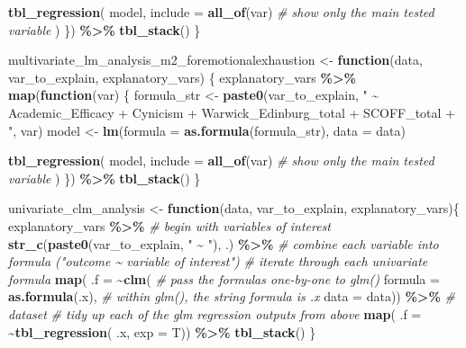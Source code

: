 \documentclass[
]{article}
\newenvironment{Shaded}{\begin{snugshade}}{\end{snugshade}}
\newcommand{\AttributeTok}[1]{\textcolor[rgb]{0.13,0.29,0.53}{#1}}
\newcommand{\CommentTok}[1]{\textcolor[rgb]{0.56,0.35,0.01}{\textit{#1}}}
\newcommand{\ControlFlowTok}[1]{\textcolor[rgb]{0.13,0.29,0.53}{\textbf{#1}}}
\newcommand{\FunctionTok}[1]{\textcolor[rgb]{0.13,0.29,0.53}{\textbf{#1}}}
\newcommand{\NormalTok}[1]{#1}
\newcommand{\OtherTok}[1]{\textcolor[rgb]{0.56,0.35,0.01}{#1}}
\newcommand{\SpecialCharTok}[1]{\textcolor[rgb]{0.81,0.36,0.00}{\textbf{#1}}}
\newcommand{\StringTok}[1]{\textcolor[rgb]{0.31,0.60,0.02}{#1}}
\begin{document}
\begin{Shaded}
\begin{Highlighting}[]
      \FunctionTok{tbl\_regression}\NormalTok{(}
\NormalTok{        model,}
        \AttributeTok{include =} \FunctionTok{all\_of}\NormalTok{(var)  }\CommentTok{\# show only the main tested variable}
\NormalTok{      )}
\NormalTok{    \}) }\SpecialCharTok{\%\textgreater{}\%}
    \FunctionTok{tbl\_stack}\NormalTok{()}
\NormalTok{\}}



\NormalTok{multivariate\_lm\_analysis\_m2\_foremotionalexhaustion }\OtherTok{\textless{}{-}} \ControlFlowTok{function}\NormalTok{(data, var\_to\_explain, explanatory\_vars) \{}
\NormalTok{  explanatory\_vars }\SpecialCharTok{\%\textgreater{}\%}
    \FunctionTok{map}\NormalTok{(}\ControlFlowTok{function}\NormalTok{(var) \{}
\NormalTok{      formula\_str }\OtherTok{\textless{}{-}} \FunctionTok{paste0}\NormalTok{(var\_to\_explain, }\StringTok{" \textasciitilde{} Academic\_Efficacy + Cynicism + Warwick\_Edinburg\_total + SCOFF\_total + "}\NormalTok{, var)}
\NormalTok{      model }\OtherTok{\textless{}{-}} \FunctionTok{lm}\NormalTok{(}\AttributeTok{formula =} \FunctionTok{as.formula}\NormalTok{(formula\_str), }\AttributeTok{data =}\NormalTok{ data)}
      
      \FunctionTok{tbl\_regression}\NormalTok{(}
\NormalTok{        model,}
        \AttributeTok{include =} \FunctionTok{all\_of}\NormalTok{(var)  }\CommentTok{\# show only the main tested variable}
\NormalTok{      )}
\NormalTok{    \}) }\SpecialCharTok{\%\textgreater{}\%}
    \FunctionTok{tbl\_stack}\NormalTok{()}
\NormalTok{\}}



\NormalTok{univariate\_clm\_analysis }\OtherTok{\textless{}{-}}
  \ControlFlowTok{function}\NormalTok{(data, var\_to\_explain, explanatory\_vars)\{}
\NormalTok{    explanatory\_vars }\SpecialCharTok{\%\textgreater{}\%}       \CommentTok{\# begin with variables of interest}
      \FunctionTok{str\_c}\NormalTok{(}\FunctionTok{paste0}\NormalTok{(var\_to\_explain, }\StringTok{" \textasciitilde{} "}\NormalTok{), .) }\SpecialCharTok{\%\textgreater{}\%}         \CommentTok{\# combine each variable into formula ("outcome \textasciitilde{} variable of interest")}
      \CommentTok{\# iterate through each univariate formula}
      \FunctionTok{map}\NormalTok{(                               }
        \AttributeTok{.f =} \SpecialCharTok{\textasciitilde{}}\FunctionTok{clm}\NormalTok{(                       }\CommentTok{\# pass the formulas one{-}by{-}one to glm()}
          \AttributeTok{formula =} \FunctionTok{as.formula}\NormalTok{(.x),      }\CommentTok{\# within glm(), the string formula is .x}
          \AttributeTok{data =}\NormalTok{ data)) }\SpecialCharTok{\%\textgreater{}\%}       \CommentTok{\# dataset}
      \CommentTok{\# tidy up each of the glm regression outputs from above}
      \FunctionTok{map}\NormalTok{(}
        \AttributeTok{.f =} \SpecialCharTok{\textasciitilde{}}\FunctionTok{tbl\_regression}\NormalTok{(}
\NormalTok{          .x,}
          \AttributeTok{exp =}\NormalTok{ T)) }\SpecialCharTok{\%\textgreater{}\%}
      \FunctionTok{tbl\_stack}\NormalTok{()}
\NormalTok{  \}}



\end{Highlighting}
\end{Shaded}
\end{document}
